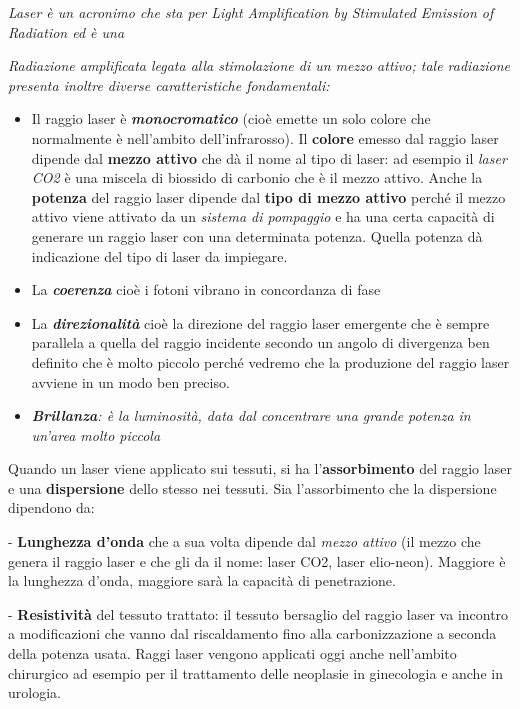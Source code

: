 \documentclass[]{article}
\begin{document}
\emph{Laser è un acronimo che sta per Light Amplification by Stimulated
Emission of Radiation ed è una}

\emph{Radiazione amplificata legata alla stimolazione di un mezzo
attivo; tale radiazione presenta inoltre diverse caratteristiche
fondamentali: }

\begin{itemize}
\item
  Il raggio laser è \textbf{\emph{monocromatico}} (cioè emette un solo
  colore che normalmente è nell'ambito dell'infrarosso). Il
  \textbf{colore} emesso dal raggio laser dipende dal \textbf{mezzo
  attivo} che dà il nome al tipo di laser: ad esempio il \emph{laser
  CO2} è una miscela di biossido di carbonio che è il mezzo attivo.
  Anche la \textbf{potenza} del raggio laser dipende dal \textbf{tipo di
  mezzo attivo} perché il mezzo attivo viene attivato da un
  \emph{sistema di pompaggio} e ha una certa capacità di generare un
  raggio laser con una determinata potenza. Quella potenza dà
  indicazione del tipo di laser da impiegare.
\item
  La \textbf{\emph{coerenza}} cioè i fotoni vibrano in concordanza di
  fase
\item
  La \textbf{\emph{direzionalità}} cioè la direzione del raggio laser
  emergente che è sempre parallela a quella del raggio incidente secondo
  un angolo di divergenza ben definito che è molto piccolo perché
  vedremo che la produzione del raggio laser avviene in un modo ben
  preciso.
\item
  \emph{\emph{\textbf{Brillanza}: è la luminosità, data dal concentrare
  una grande potenza in un'area molto piccola}}
\end{itemize}

Quando un laser viene applicato sui tessuti, si ha
l'\textbf{assorbimento} del raggio laser e una \textbf{dispersione}
dello stesso nei tessuti. Sia l'assorbimento che la dispersione
dipendono da:

- \textbf{Lunghezza d'onda} che a sua volta dipende dal \emph{mezzo
attivo} (il mezzo che genera il raggio laser e che gli da il nome: laser
CO2, laser elio-neon). Maggiore è la lunghezza d'onda, maggiore sarà la
capacità di penetrazione.

- \textbf{Resistività} del tessuto trattato: il tessuto bersaglio del
raggio laser va incontro a modificazioni che vanno dal riscaldamento
fino alla carbonizzazione a seconda della potenza usata. Raggi laser
vengono applicati oggi anche nell'ambito chirurgico ad esempio per il
trattamento delle neoplasie in ginecologia e anche in urologia.
\end{document}
